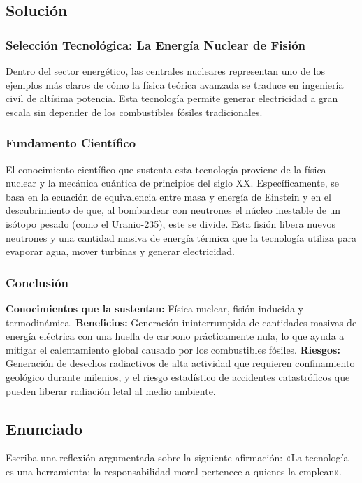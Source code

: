 \documentclass[12pt, a4paper]{article}
\begin{document}
\subsection*{Solución}

\subsubsection*{Selección Tecnológica: La Energía Nuclear de Fisión}
Dentro del sector energético, las centrales nucleares representan uno de los ejemplos más claros de cómo la física teórica avanzada se traduce en ingeniería civil de altísima potencia. Esta tecnología permite generar electricidad a gran escala sin depender de los combustibles fósiles tradicionales.

\subsubsection*{Fundamento Científico}
El conocimiento científico que sustenta esta tecnología proviene de la física nuclear y la mecánica cuántica de principios del siglo XX. Específicamente, se basa en la ecuación de equivalencia entre masa y energía de Einstein y en el descubrimiento de que, al bombardear con neutrones el núcleo inestable de un isótopo pesado (como el Uranio-235), este se divide. Esta fisión libera nuevos neutrones y una cantidad masiva de energía térmica que la tecnología utiliza para evaporar agua, mover turbinas y generar electricidad.

\subsubsection*{Conclusión}
\textbf{Conocimientos que la sustentan:} Física nuclear, fisión inducida y termodinámica.
\newline\newline
\textbf{Beneficios:} Generación ininterrumpida de cantidades masivas de energía eléctrica con una huella de carbono prácticamente nula, lo que ayuda a mitigar el calentamiento global causado por los combustibles fósiles.
\newline\newline
\textbf{Riesgos:} Generación de desechos radiactivos de alta actividad que requieren confinamiento geológico durante milenios, y el riesgo estadístico de accidentes catastróficos que pueden liberar radiación letal al medio ambiente.

\newpage

\subsection*{Enunciado}
Escriba una reflexión argumentada sobre la siguiente afirmación: «La tecnología es una herramienta; la responsabilidad moral pertenece a quienes la emplean».
\end{document}
